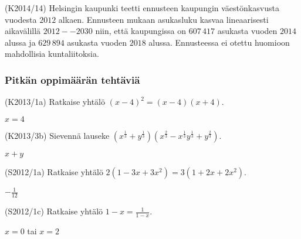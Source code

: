 \begin{tehtava} (K2014/14) Helsingin kaupunki teetti ennusteen kaupungin väestönkasvusta vuodesta $2012$ 
alkaen. Ennusteen mukaan asukasluku kasvaa lineaarisesti aikavälillä $2012--2030$ niin, että kaupungissa 
on $607\,417$ asukasta vuoden $2014$ alussa ja $629\,894$ asukasta vuoden $2018$ alussa. Ennusteessa 
ei otettu huomioon mahdollisia kuntaliitoksia.
    \begin{vastaus}
    \end{vastaus}
\end{tehtava}


\subsubsection*{Pitkän oppimäärän tehtäviä}

\begin{tehtava} (K2013/1a) Ratkaise yhtälö $(x-4)^2=(x-4)(x+4)$.
	\begin{vastaus}
	$x=4$
	\end{vastaus}
\end{tehtava}

\begin{tehtava}
	(K2013/3b) Sievennä lauseke $(x^\frac{1}{3} + y^\frac{1}{3})(x^\frac{2}{3} - x^\frac{1}{3}y^\frac{1}{3} + y^\frac{2}{3})$.
		\begin{vastaus}
		$x+y$
		\end{vastaus}
\end{tehtava}
						
\begin{tehtava} (S2012/1a) Ratkaise yhtälö $2(1-3x+3x^2)=3(1+2x+2x^2)$.
	\begin{vastaus}
		$-\frac{1}{12}$
		\end{vastaus}
\end{tehtava}

\begin{tehtava}(S2012/1c) Ratkaise yhtälö $1-x=\frac{1}{1-x}$.
			\begin{vastaus}
				$x=0$ tai $x=2$
				\end{vastaus}
\end{tehtava}

